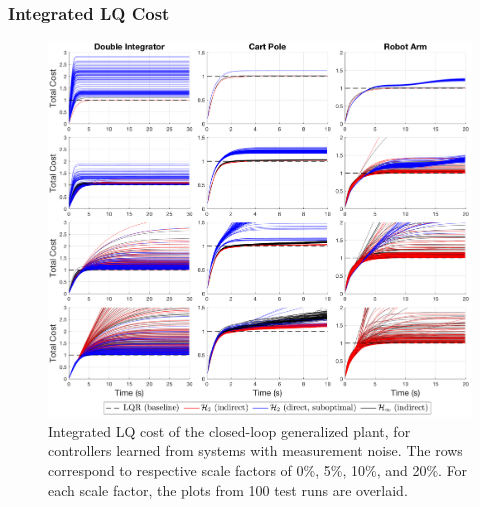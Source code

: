 \subsubsection{Integrated LQ Cost}
\begin{figure}[H]
\centering
	\includegraphics[width=\textwidth]{figures/noise_integrated_cost4_s.png}
\caption{Integrated LQ cost of the closed-loop generalized plant, for controllers learned from systems with measurement noise.  The rows correspond to respective scale factors of 0\%, 5\%, 10\%, and 20\%.  For each scale factor, the plots from 100 test runs are overlaid.}
\label{fig:noise_integrated_cost4_s}
\end{figure}

\newpage
